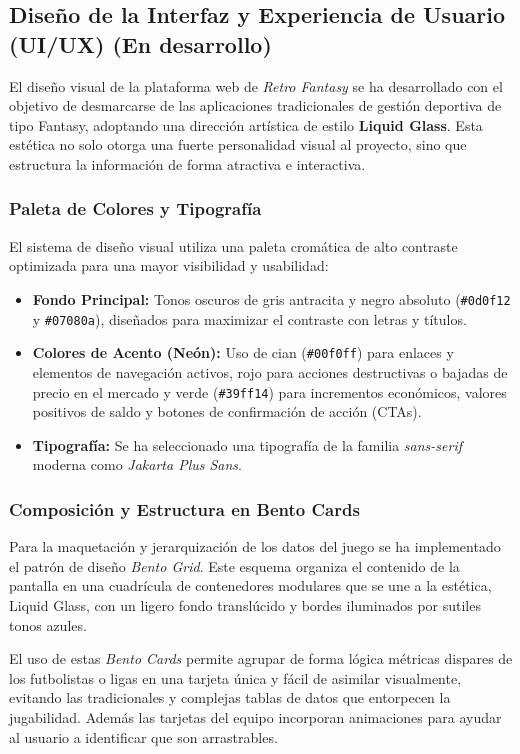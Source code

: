 \subsection{Diseño de la Interfaz y Experiencia de Usuario (UI/UX) (En desarrollo)}
El diseño visual de la plataforma web de \textit{Retro Fantasy} se ha desarrollado con el objetivo de desmarcarse de las aplicaciones tradicionales de gestión deportiva de tipo Fantasy, adoptando una dirección artística de estilo \textbf{Liquid Glass}. Esta estética no solo otorga una fuerte personalidad visual al proyecto, sino que estructura la información de forma atractiva e interactiva.

\subsubsection{Paleta de Colores y Tipografía}
El sistema de diseño visual utiliza una paleta cromática de alto contraste optimizada para una mayor visibilidad y usabilidad:
\begin{itemize}
    \item \textbf{Fondo Principal:} Tonos oscuros de gris antracita y negro absoluto (\texttt{\#0d0f12} y \texttt{\#07080a}), diseñados para maximizar el contraste con letras y títulos.
    \item \textbf{Colores de Acento (Neón):} Uso de cian (\texttt{\#00f0ff}) para enlaces y elementos de navegación activos, rojo para acciones destructivas o bajadas de precio en el mercado y verde (\texttt{\#39ff14}) para incrementos económicos, valores positivos de saldo y botones de confirmación de acción (CTAs).
    \item \textbf{Tipografía:} Se ha seleccionado una tipografía de la familia \textit{sans-serif} moderna como \textit{Jakarta Plus Sans}.
\end{itemize}

\subsubsection{Composición y Estructura en Bento Cards}
Para la maquetación y jerarquización de los datos del juego se ha implementado el patrón de diseño \textit{Bento Grid}. Este esquema organiza el contenido de la pantalla en una cuadrícula de contenedores modulares que se une a la estética, Liquid Glass, con un ligero fondo translúcido y bordes iluminados por sutiles tonos azules. 

El uso de estas \textit{Bento Cards} permite agrupar de forma lógica métricas dispares de los futbolistas o ligas en una tarjeta única y fácil de asimilar visualmente, evitando las tradicionales y complejas tablas de datos que entorpecen la jugabilidad. Además las tarjetas del equipo incorporan animaciones para ayudar al usuario a identificar que son arrastrables.

